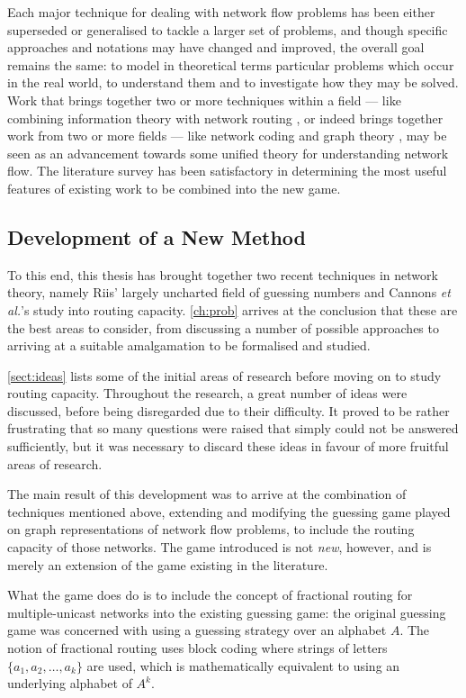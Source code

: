 Each major technique for dealing with network flow problems has been either superseded or generalised to tackle a larger set of problems, and though specific approaches and notations may have changed and improved, the overall goal remains the same: to model in theoretical terms particular problems which occur in the real world, to understand them and to investigate how they may be solved. Work that brings together two or more techniques within a field --- like combining information theory with network routing \cite{ahls2000}, or indeed brings together work from two or more fields --- like network coding and graph theory \cite{riis2005util, riis2005info}, may be seen as an advancement towards some unified theory for understanding network flow. The literature survey has been satisfactory in determining the most useful features of existing work to be combined into the new game.

\subsection{Development of a New Method}

To this end, this thesis has brought together two recent techniques in network theory, namely Riis' largely uncharted field of guessing numbers and Cannons \textit{et al.}'s study into routing capacity. \autoref{ch:prob} arrives at the conclusion that these are the best areas to consider, from discussing a number of possible approaches to arriving at a suitable amalgamation to be formalised and studied.

\autoref{sect:ideas} lists some of the initial areas of research before moving on to study routing capacity. Throughout the research, a great number of ideas were discussed, before being disregarded due to their difficulty. It proved to be rather frustrating that so many questions were raised that simply could not be answered sufficiently, but it was necessary to discard these ideas in favour of more fruitful areas of research.

The main result of this development was to arrive at the combination of techniques mentioned above, extending and modifying the guessing game played on graph representations of network flow problems, to include the routing capacity of those networks. The game introduced is not \emph{new}, however, and is merely an extension of the game existing in the literature.

What the game does do is to include the concept of fractional routing for multiple-unicast networks into the existing guessing game: the original guessing game was concerned with using a guessing strategy over an alphabet $A$. The notion of fractional routing uses block coding where strings of letters $\{ a_1, a_2, \dots, a_k \}$ are used, which is mathematically equivalent to using an underlying alphabet of $A^k$.

